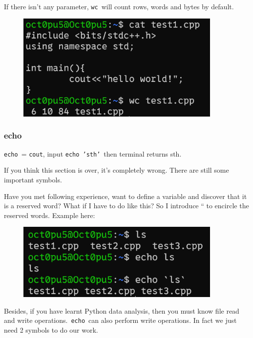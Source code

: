 \documentclass[12pt]{ctexart}
\begin{document}
If there isn't any parameter, \texttt{wc}\ will count
rows, words and bytes by default.

\begin{figure}[H]
    \centering
    \includegraphics[width=0.9\textwidth,keepaspectratio]{assets/Linux/1.5 Linux file commands/12.png}
\end{figure}

\subsubsection{\textbf{echo}}

\texttt{echo}\ = \texttt{cout}, input \texttt{echo\ 'sth'}\ then terminal
returns sth.

If you think this section is over, it's completely
wrong. There are still some important symbols.

Have you met following experience, want to define a variable and
discover that it is a reserved word? What if I have to do like this? So
I introduce `` to encircle the reserved words. Example here:

\begin{figure}[H]
    \centering
    \includegraphics[width=0.9\textwidth,keepaspectratio]{assets/Linux/1.5 Linux file commands/13.png}
\end{figure}

Besides, if you have learnt Python data analysis, then you must know
file read and write operations.\ \texttt{echo}\ can also perform write
operations. In fact we just need 2 symbols to do our work.
\end{document}
